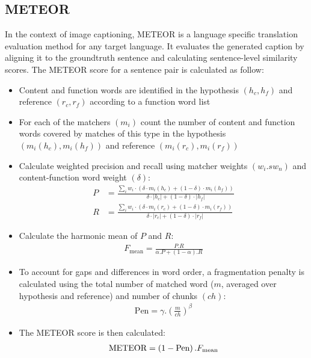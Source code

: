 \subsection{METEOR}
In the context of image captioning, METEOR \cite{denkowski:lavie:meteor-wmt:2014} is a language specific translation evaluation method for any target language. It evaluates the generated caption by aligning it to the groundtruth sentence and calculating sentence-level similarity scores.
The METEOR score for a sentence pair is calculated as follow:
\begin{itemize}
	\item Content and function words are identified in the hypothesis $\left(h_c, h_f\right)$ and reference $\left(r_c, r_f \right)$ according to a function word list

	\item For each of the matchers $\left( m_i \right)$ count the number of content and function words covered by matches of this type in the hypothesis $\left(m_i\left(h_c\right), m_i\left(h_f\right)\right)$ and reference $\left(m_i\left(r_c\right), m_i\left(r_f\right) \right)$

	\item Calculate weighted precision and recall using matcher weights $\left(w_i .s w_n\right)$ and content-function word weight $\left( \delta \right)$:
	\begin{align}
		P &= \frac{\sum_i w_i \cdot \left( \delta \cdot m_i\left(h_c\right) + \left(1 - \delta \right) \cdot m_i \left(h_f\right) \right)}{\delta \cdot |h_c| + \left( 1 - \delta \right) \cdot |h_f|} \\
		R &= \frac{\sum_i w_i \cdot \left( \delta \cdot m_i\left(r_c\right) + \left(1 - \delta \right) \cdot m_i \left(r_f\right) \right)}{\delta \cdot |r_c| + \left( 1 - \delta \right) \cdot |r_f|}
	\end{align}

	\item Calculate the harmonic mean of $P$ and $R$:
	\begin{align}
		F_{\text{mean}} = \frac{P . R}{\alpha . P + \left( 1 - \alpha \right) . R}
	\end{align}

	\item To account for gaps and differences in word order, a fragmentation penalty is calculated using the total number of matched word ($m$, averaged over hypothesis and reference) and number of chunks $\left(ch\right)$:
	\begin{align}
		\text{Pen} = \gamma . \left( \frac{m}{ch} \right) ^ \beta
	\end{align}

	\item The METEOR score is then calculated:
	\begin{align}
		\centering
		\text{METEOR} = \left(1 - \text{Pen} \right) . F_{\text{mean}}
	\end{align}
\end{itemize}


